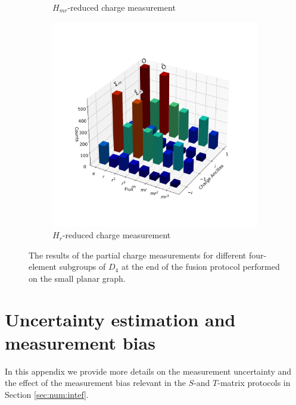 \documentclass[a4paper,twocolumn,11pt]{quantumarticle}
\begin{document}
\begin{figure}
\begin{subfigure}{0.49\linewidth}
        \caption{$H_{mr}$-reduced charge measurement}
        \label{fig:basket_Hmr}
    \end{subfigure}
    \begin{subfigure}{0.5\linewidth}
        \centering
        \includegraphics[width=\linewidth]{Figures/basket_r.png}
        \caption{$H_r$-reduced charge measurement}
        \label{fig:basket_Hr}
    \end{subfigure}
    \caption{The results of the partial charge measurements for different four-element subgroups of $D_4$ at the end of the fusion protocol performed on the small planar graph.}
    \label{fig:basket_all_subs}
\end{figure}

\section{Uncertainty estimation and measurement bias}
In this appendix we provide more details on the measurement uncertainty and the effect of the measurement bias relevant in the $S$-and $T$-matrix protocols in Section \ref{sec:num:intef}.
\end{document}
